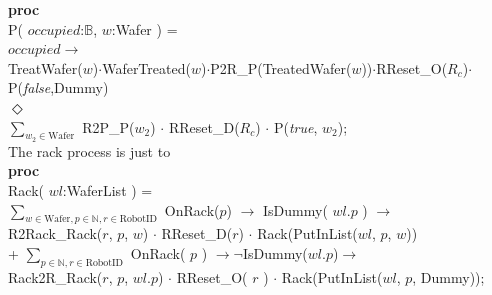 \documentclass[12pt]{report}
\begin{document}
	{\small
	\textbf{proc}\\
	\phantom{---} P( $occupied$:$\mathbb{B}$, $w$:Wafer ) =\\
	\phantom{------} $occupied\rightarrow$\\
	\phantom{---------} TreatWafer($w$)$\cdot$WaferTreated($w$)$\cdot$P2R\_P(TreatedWafer($w$))$\cdot$RReset\_O($R_c$)$\cdot$P(\emph{false},Dummy)\\
	\phantom{------} $\Diamond$\\
	\phantom{---------} $\sum\nolimits_{w_2\in \text{Wafer}}$ R2P\_P($w_2$) $\cdot$ RReset\_D($R_c$) $\cdot$ P(\emph{true}, $w_2$);
	}\\
	The rack process is just to \\
	{\small
	\textbf{proc}\\
	\phantom{---} Rack( $wl$:WaferList ) =\\
	\phantom{-------} $\sum\nolimits_{w\in \text{Wafer}, p \in \mathbb{N}, r \in \text{RobotID}}$ OnRack($p$) $\rightarrow$ IsDummy( $wl.p$ ) $\rightarrow$\\
	\phantom{-----------} R2Rack\_Rack($r$, $p$, $w$) $\cdot$ RReset\_D($r$) $\cdot$ Rack(PutInList($wl$, $p$, $w$))\\
	\phantom{-------} + $\sum\nolimits_{p \in \mathbb{N}, r \in \text{RobotID}}$ OnRack( $p$ ) $\rightarrow \neg$IsDummy($wl.p$)$\rightarrow$\\
	\phantom{-----------} Rack2R\_Rack($r$, $p$, $wl.p$) $\cdot$ RReset\_O( $r$ ) $\cdot$ Rack(PutInList($wl$, $p$, Dummy));
	}\\
\end{document}
